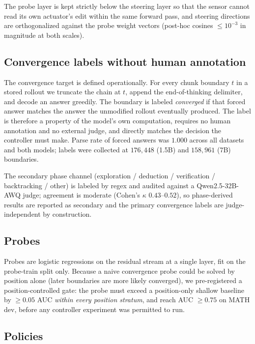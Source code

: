The probe layer is kept strictly below the steering layer so that the sensor
cannot read its own actuator's edit within the same forward pass, and steering
directions are orthogonalized against the probe weight vectors (post-hoc
cosines $\le 10^{-3}$ in magnitude at both scales).

\subsection{Convergence labels without human annotation}
\label{sec:labels}

The convergence target is defined operationally. For every chunk boundary $t$
in a stored rollout we truncate the chain at $t$, append the end-of-thinking
delimiter, and decode an answer greedily. The boundary is labeled
\emph{converged} if that forced answer matches the answer the unmodified
rollout eventually produced. The label is therefore a property of the model's
own computation, requires no human annotation and no external judge, and
directly matches the decision the controller must make. Parse rate of forced
answers was $1.000$ across all datasets and both models; labels were collected
at $176{,}448$ (1.5B) and $158{,}961$ (7B) boundaries.

The secondary phase channel (exploration / deduction / verification /
backtracking / other) is labeled by regex and audited against a
Qwen2.5-32B-AWQ judge; agreement is moderate (Cohen's $\kappa$ $0.43$--$0.52$),
so phase-derived results are reported as secondary and the primary convergence
labels are judge-independent by construction.

\subsection{Probes}

Probes are logistic regressions on the residual stream at a single layer,
fit on the probe-train split only. Because a naive convergence probe could be
solved by position alone (later boundaries are more likely converged), we
pre-registered a position-controlled gate: the probe must exceed a
position-only shallow baseline by $\ge 0.05$ AUC \emph{within every position
stratum}, and reach AUC $\ge 0.75$ on MATH dev, before any controller
experiment was permitted to run.

\subsection{Policies}

